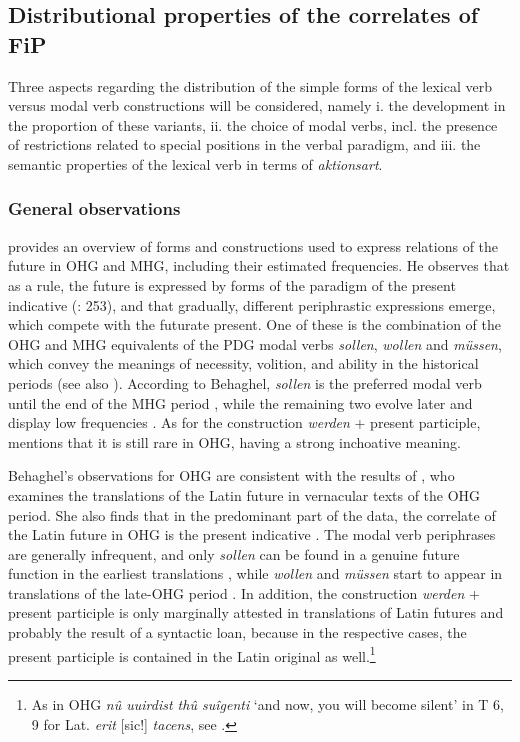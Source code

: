 \documentclass[output=paper,colorlinks,citecolor=brown]{langscibook}
\begin{document}
\subsection{Distributional properties of the correlates of FiP} \label{section 4.2}

Three aspects regarding the distribution of the simple forms of the lexical verb versus modal verb constructions will be considered, namely i. the development in the proportion of these variants, ii. the choice of modal verbs, incl. the presence of restrictions related to special positions in the verbal paradigm, and iii. the semantic properties of the lexical verb in terms of \textit{aktionsart}.

\subsubsection{General observations} \label{section 4.2.1}

\citet[253–266]{Behaghel1924} provides an overview of forms and constructions used to express relations of the future in OHG and MHG, including their estimated frequencies. He observes that as a rule, the future is expressed by forms of the paradigm of the present indicative (\cite{Behaghel1924}: 253), and that gradually, different periphrastic expressions emerge, which compete with the futurate present. One of these is the combination of the OHG and MHG equivalents of the PDG modal verbs \textit{sollen}, \textit{wollen} and \textit{müssen}, which convey the meanings of necessity, volition, and ability in the historical periods (see also \cite{Lühr1997}). According to Behaghel, \textit{sollen} is the preferred modal verb until the end of the MHG period \citep[259]{Behaghel1924}, while the remaining two evolve later and display low frequencies \citep[259–260]{Behaghel1924}. As for the construction \textit{werden} + present participle, \citet[261]{Behaghel1924} mentions that it is still rare in OHG, having a strong inchoative meaning.

Behaghel’s observations for OHG are consistent with the results of \citet{Hinsdale1897}, who examines the translations of the Latin future in vernacular texts of the OHG period. She also finds that in the predominant part of the data, the correlate of the Latin future in OHG is the present indicative \citep[37]{Hinsdale1897}. The modal verb periphrases are generally infrequent, and only \textit{sollen} can be found in a genuine future function in the earliest translations \citep[9]{Hinsdale1897}, while \textit{wollen} and \textit{müssen} start to appear in translations of the late-OHG period \citep[37]{Hinsdale1897}. In addition, the construction \textit{werden} + present participle is only marginally attested in translations of Latin futures and probably the result of a syntactic loan, because in the respective cases, the present participle is contained in the Latin original as well.\footnote{As in OHG \textit{nû uuirdist thû suîgenti} ‘and now, you will become silent’ in T 6, 9 for Lat. \textit{erit }[sic!]\textit{ tacens}, see \citet[10 and 38]{Hinsdale1897}.}
\end{document}
